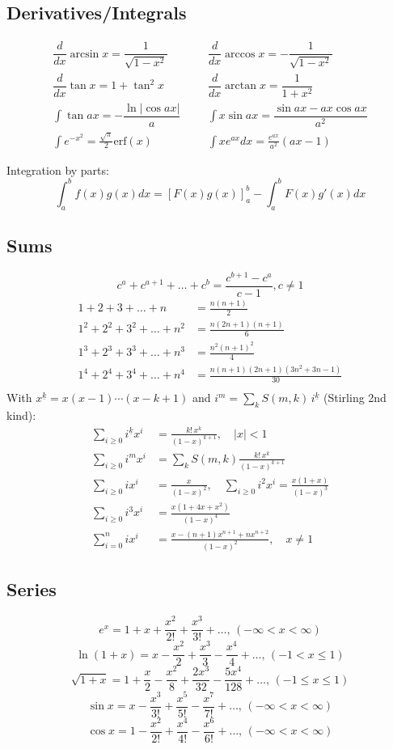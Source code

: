 \subsection{Derivatives/Integrals}
\begin{align*}
	\dfrac{d}{dx}\arcsin x = \dfrac{1}{\sqrt{1-x^2}} &&& \dfrac{d}{dx}\arccos x = -\dfrac{1}{\sqrt{1-x^2}} \\
	\dfrac{d}{dx}\tan x = 1+\tan^2 x &&& \dfrac{d}{dx}\arctan x = \dfrac{1}{1+x^2} \\
	\int\tan ax = -\dfrac{\ln|\cos ax|}{a} &&& \int x\sin ax = \dfrac{\sin ax-ax \cos ax}{a^2} \\
	\int e^{-x^2} = \frac{\sqrt \pi}{2} \text{erf}(x) &&& \int xe^{ax}dx = \frac{e^{ax}}{a^2}(ax-1)
\end{align*}

Integration by parts:
\[\int_a^bf(x)g(x)dx = [F(x)g(x)]_a^b-\int_a^bF(x)g'(x)dx\]

\subsection{Sums}
\[ c^a + c^{a+1} + \dots + c^{b} = \frac{c^{b+1} - c^a}{c-1}, c \neq 1 \]
\begin{align*}
	1 + 2 + 3 + \dots + n &= \frac{n(n+1)}{2} \\
	1^2 + 2^2 + 3^2 + \dots + n^2 &= \frac{n(2n+1)(n+1)}{6} \\
	1^3 + 2^3 + 3^3 + \dots + n^3 &= \frac{n^2(n+1)^2}{4} \\
	1^4 + 2^4 + 3^4 + \dots + n^4 &= \frac{n(n+1)(2n+1)(3n^2 + 3n - 1)}{30} \\
\end{align*}
With $x^{\underline{k}}=x(x-1)\cdots(x-k+1)$ and $i^m=\sum_k S(m,k)\,i^{\underline{k}}$ (Stirling 2nd kind):
\begin{align*}
	\sum_{i\geq0} i^{\underline{k}}x^i &= \frac{k!\,x^k}{(1-x)^{k+1}},\quad |x|<1 \\
	\sum_{i\geq0} i^m x^i &= \sum_k S(m,k)\frac{k!\,x^k}{(1-x)^{k+1}} \\
	\sum_{i\geq0} ix^i &= \frac{x}{(1-x)^2},\quad \sum_{i\geq0} i^2x^i = \frac{x(1+x)}{(1-x)^3} \\
	\sum_{i\geq0} i^3x^i &= \frac{x(1+4x+x^2)}{(1-x)^4} \\
	\sum_{i=0}^{n} ix^i &= \frac{x-(n+1)x^{n+1}+nx^{n+2}}{(1-x)^2},\quad x\neq1
\end{align*}

\subsection{Series}
$$e^x = 1+x+\frac{x^2}{2!}+\frac{x^3}{3!}+\dots,\,(-\infty<x<\infty)$$
$$\ln(1+x) = x-\frac{x^2}{2}+\frac{x^3}{3}-\frac{x^4}{4}+\dots,\,(-1<x\leq1)$$
$$\sqrt{1+x} = 1+\frac{x}{2}-\frac{x^2}{8}+\frac{2x^3}{32}-\frac{5x^4}{128}+\dots,\,(-1\leq x\leq1)$$
$$\sin x = x-\frac{x^3}{3!}+\frac{x^5}{5!}-\frac{x^7}{7!}+\dots,\,(-\infty<x<\infty)$$
$$\cos x = 1-\frac{x^2}{2!}+\frac{x^4}{4!}-\frac{x^6}{6!}+\dots,\,(-\infty<x<\infty)$$

